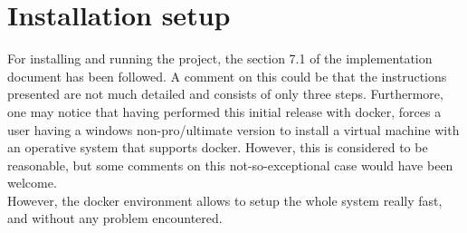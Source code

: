 \section{Installation setup}
For installing and running the project, the section 7.1 of the implementation document has been followed. 
A comment on this could be that the instructions presented are not much detailed and consists of only three steps. 
Furthermore, one may notice that having performed this initial release with docker, forces a user having a windows non-pro/ultimate version to
install a virtual machine with an operative system that supports docker. However, this is considered to be reasonable, but some comments
on this not-so-exceptional case would have been welcome. \\
However, the docker environment allows to setup the whole system really fast, and without any problem encountered. 